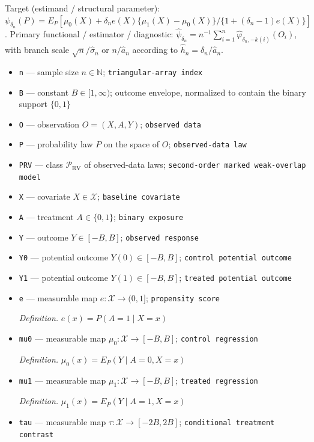 \documentclass{article}
\begin{document}
Target (estimand / structural parameter): \(\psi_{\delta_n}(P)=E_P[\mu_0(X)+\delta_ne(X)\{\mu_1(X)-\mu_0(X)\}/\{1+(\delta_n-1)e(X)\}]\).
Primary functional / estimator / diagnostic: \(\widehat\psi_{\delta_n}=n^{-1}\sum_{i=1}^n\widehat\varphi_{\delta_n,-k(i)}(O_i)\), with branch scale \(\sqrt n/\widehat\sigma_n\) or \(n/\widehat a_n\) according to \(\widehat h_n=\delta_n/\widehat a_n\).
\begin{itemize}
  \item \texttt{n} --- sample size \(n\in\mathbb{N}\); \texttt{triangular-\allowbreak{}array index}
  \item \texttt{B} --- constant \(B\in[1,\infty)\); outcome envelope, normalized to contain the binary support \(\{0,1\}\)
  \item \texttt{O} --- observation \(O=(X,A,Y)\); \texttt{observed data}
  \item \texttt{P} --- probability law \(P\) on the space of \(O\); \texttt{observed-\allowbreak{}data law}
  \item \texttt{PRV} --- class \(\mathcal P_{\mathrm{RV}}\) of observed-data laws; \texttt{second-\allowbreak{}order marked weak-\allowbreak{}overlap model}
  \item \texttt{X} --- covariate \(X\in\mathcal X\); \texttt{baseline covariate}
  \item \texttt{A} --- treatment \(A\in\{0,1\}\); \texttt{binary exposure}
  \item \texttt{Y} --- outcome \(Y\in[-B,B]\); \texttt{observed response}
  \item \texttt{Y0} --- potential outcome \(Y(0)\in[-B,B]\); \texttt{control potential outcome}
  \item \texttt{Y1} --- potential outcome \(Y(1)\in[-B,B]\); \texttt{treated potential outcome}
  \item \texttt{e} --- measurable map \(e:\mathcal X\to(0,1]\); \texttt{propensity score}
  \par\smallskip\noindent\emph{Definition.} \(e(x)=P(A=1\mid X=x)\)
  \item \texttt{mu0} --- measurable map \(\mu_0:\mathcal X\to[-B,B]\); \texttt{control regression}
  \par\smallskip\noindent\emph{Definition.} \(\mu_0(x)=E_P(Y\mid A=0,X=x)\)
  \item \texttt{mu1} --- measurable map \(\mu_1:\mathcal X\to[-B,B]\); \texttt{treated regression}
  \par\smallskip\noindent\emph{Definition.} \(\mu_1(x)=E_P(Y\mid A=1,X=x)\)
  \item \texttt{tau} --- measurable map \(\tau:\mathcal X\to[-2B,2B]\); \texttt{conditional treatment contrast}

\end{itemize}
\end{document}
